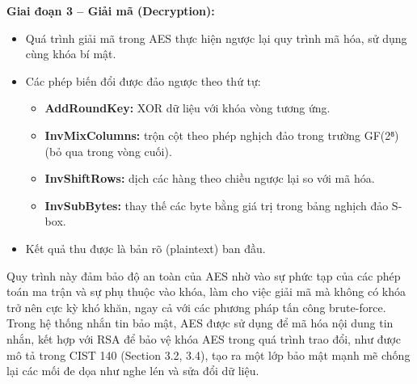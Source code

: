 \textbf{Giai đoạn 3 – Giải mã (Decryption):} 
    \begin{itemize}
      \item Quá trình giải mã trong AES thực hiện ngược lại quy trình mã hóa, sử dụng cùng khóa bí mật.
    
      \item Các phép biến đổi được đảo ngược theo thứ tự:
        \begin{itemize}
          \item \textbf{AddRoundKey:} XOR dữ liệu với khóa vòng tương ứng.
          \item \textbf{InvMixColumns:} trộn cột theo phép nghịch đảo trong trường GF(2⁸) (bỏ qua trong vòng cuối).
          \item \textbf{InvShiftRows:} dịch các hàng theo chiều ngược lại so với mã hóa.
          \item \textbf{InvSubBytes:} thay thế các byte bằng giá trị trong bảng nghịch đảo S-box.
        \end{itemize}
      \item Kết quả thu được là bản rõ (plaintext) ban đầu.
    \end{itemize}
  

\indent Quy trình này đảm bảo độ an toàn của AES nhờ vào sự phức tạp của các phép toán ma trận và sự phụ thuộc vào khóa, làm cho việc giải mã mà không có khóa trở nên cực kỳ khó khăn, ngay cả với các phương pháp tấn công brute-force. Trong hệ thống nhắn tin bảo mật, AES được sử dụng để mã hóa nội dung tin nhắn, kết hợp với RSA để bảo vệ khóa AES trong quá trình trao đổi, như được mô tả trong CIST 140 (Section 3.2, 3.4), tạo ra một lớp bảo mật mạnh mẽ chống lại các mối đe dọa như nghe lén và sửa đổi dữ liệu.
